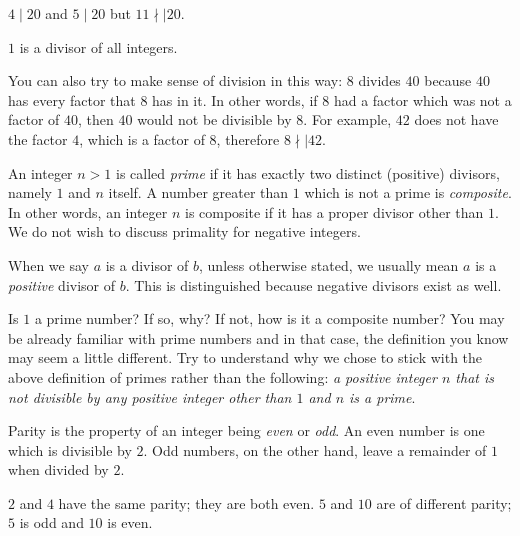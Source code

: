 \documentclass{subfile}
\begin{document}
	\begin{example}
		$4 \mid 20$ and $5 \mid 20$ but $11\nmid\mid 20$.
	\end{example}

	\begin{example}
		$1$ is a divisor of all integers.
	\end{example}

	You can also try to make sense of division in this way: $8$ divides $40$ because $40$ has every factor that $8$ has in it. In other words, if $8$ had a factor which was not a factor of $40$, then $40$ would not be divisible by $8$. For example, $42$ does not have the factor $4$, which is a factor of $8$, therefore $8 \nmid\mid 42$.

	\begin{definition}
		An integer $n>1$ is called \textit{prime} if it has exactly two distinct (positive) divisors, namely $1$ and $n$ itself. A number greater than $1$ which is not a prime is \textit{composite}. In other words, an integer $n$ is composite if it has a proper divisor other than $1$. We do not wish to discuss primality for negative integers.
	\end{definition}

	\begin{note}
		When we say $a$ is a divisor of $b$, unless otherwise stated, we usually mean $a$ is a \textit{positive} divisor of $b$. This is distinguished because negative divisors exist as well.
	\end{note}

	\begin{question}
		Is $1$ a prime number? If so, why? If not, how is it a composite number? You may be already familiar with prime numbers and in that case, the definition you know may seem a little different. Try to understand why we chose to stick with the above definition of primes rather than the following: \textit{a positive integer $n$ that is not divisible by any positive integer other than $1$ and $n$ is a prime}.
	\end{question}

	\begin{definition}[Parity]
		Parity is the property of an integer being \textit{even} or \textit{odd}. An even number is one which is divisible by $2$. Odd numbers, on the other hand, leave a remainder of $1$ when divided by $2$.
	\end{definition}

	\begin{example}
		$2$ and $4$ have the same parity; they are both even. $5$ and $10$ are of different parity; $5$ is odd and $10$ is even.
	\end{example}
\end{document}
